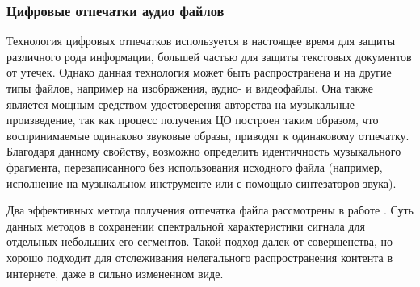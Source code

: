  \subsubsection{Цифровые отпечатки аудио файлов}
 \par Технология цифровых отпечатков используется в настоящее время
 для защиты различного рода информации, большей частью для защиты текстовых документов от утечек. Однако данная технология может быть распространена и на другие типы файлов, например на изображения, аудио- и видеофайлы. Она также является мощным средством удостоверения авторства на музыкальные произведение, так как процесс получения ЦО построен таким образом, что воспринимаемые одинаково звуковые образы, приводят к одинаковому отпечатку. Благодаря данному свойству, возможно определить идентичность музыкального фрагмента, перезаписанного без использования исходного файла (например, исполнение на музыкальном инструменте или с помощью синтезаторов звука).
 \par Два эффективных метода получения отпечатка файла рассмотрены в работе \cite{borisova2015}. Суть данных методов в сохранении спектральной характеристики сигнала для отдельных небольших его сегментов. Такой подход далек от совершенства, но хорошо подходит для отслеживания нелегального распространения контента в интернете, даже в сильно измененном виде.
 
